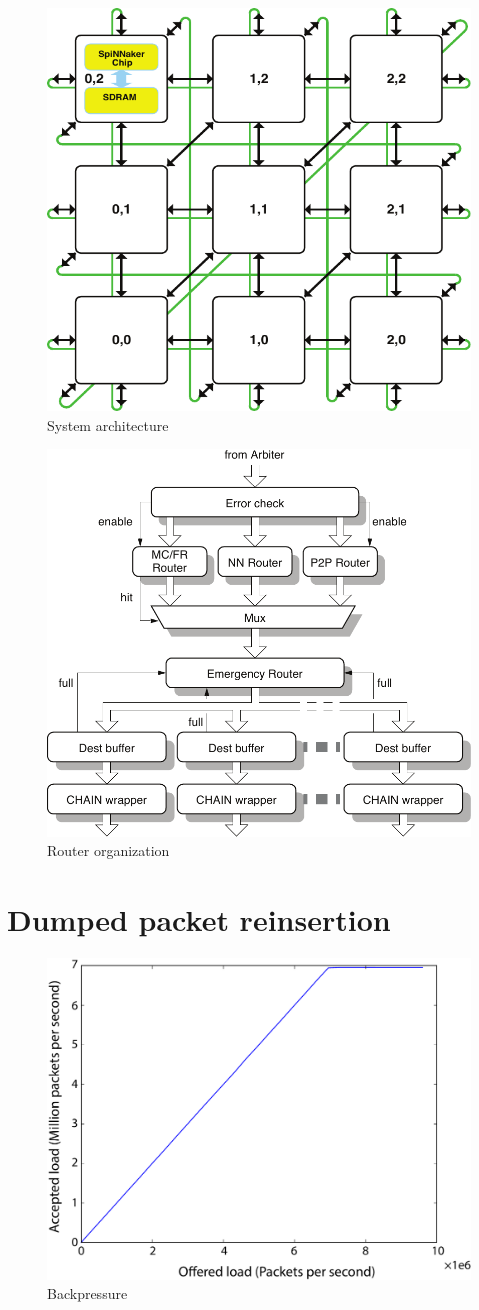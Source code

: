 \documentclass[oneside, a4paper, 11pt]{memoir}
\begin{document}
\begin{figure}[htbp]
	\centering
	\includegraphics[width=0.4\linewidth]{images/system_architecture.pdf}
	\caption{System architecture}	
\end{figure}

\begin{figure}[htbp]
	\centering
	\includegraphics[width=0.6\linewidth]{images/router_organization.pdf}
	\caption{Router organization}	
\end{figure}

\clearpage
\chapter{Dumped packet reinsertion}
\begin{figure}[htbp]
	\centering
	\includegraphics[width=0.6\linewidth]{images/backpressure.pdf}
	\caption{Backpressure}	
\end{figure}
\end{document}

